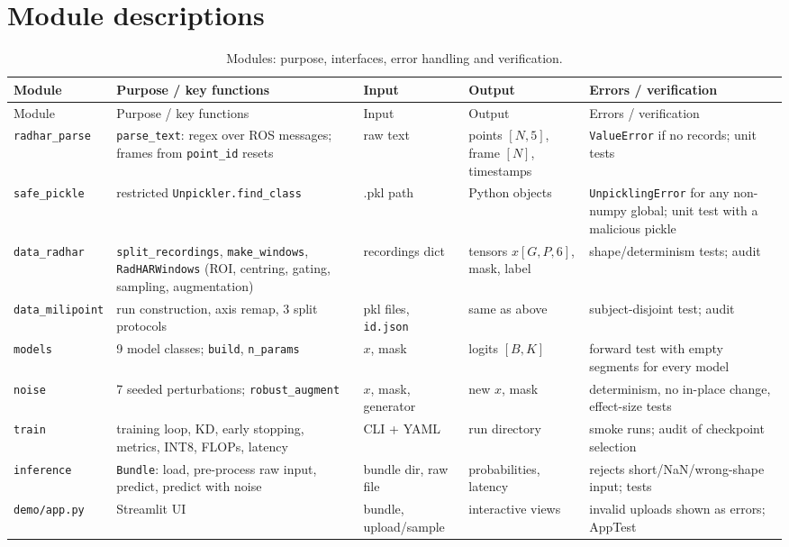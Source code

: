 \section{Module descriptions}
\begin{longtable}{L{2.6cm}L{3.4cm}L{2.6cm}L{2.6cm}L{3.2cm}}
\caption{Modules: purpose, interfaces, error handling and verification.}\label{tab:modules}\\
\toprule
Module & Purpose / key functions & Input & Output & Errors / verification \\
\midrule\endfirsthead
\toprule Module & Purpose / key functions & Input & Output & Errors / verification \\ \midrule\endhead
\texttt{radhar\_parse} & \texttt{parse\_text}: regex over ROS messages; frames from \texttt{point\_id} resets & raw text & points $[N,5]$, frame $[N]$, timestamps & \texttt{ValueError} if no records; unit tests \\
\texttt{safe\_pickle} & restricted \texttt{Unpickler.find\_class} & .pkl path & Python objects & \texttt{UnpicklingError} for any non-numpy global; unit test with a malicious pickle \\
\texttt{data\_radhar} & \texttt{split\_recordings}, \texttt{make\_windows}, \texttt{RadHARWindows} (ROI, centring, gating, sampling, augmentation) & recordings dict & tensors $x[G,P,6]$, mask, label & shape/determinism tests; audit \\
\texttt{data\_milipoint} & run construction, axis remap, 3 split protocols & pkl files, \texttt{id.json} & same as above & subject-disjoint test; audit \\
\texttt{models} & 9 model classes; \texttt{build}, \texttt{n\_params} & $x$, mask & logits $[B,K]$ & forward test with empty segments for every model \\
\texttt{noise} & 7 seeded perturbations; \texttt{robust\_augment} & $x$, mask, generator & new $x$, mask & determinism, no in-place change, effect-size tests \\
\texttt{train} & training loop, KD, early stopping, metrics, INT8, FLOPs, latency & CLI + YAML & run directory & smoke runs; audit of checkpoint selection \\
\texttt{inference} & \texttt{Bundle}: load, pre-process raw input, predict, predict with noise & bundle dir, raw file & probabilities, latency & rejects short/NaN/wrong-shape input; tests \\
\texttt{demo/app.py} & Streamlit UI & bundle, upload/sample & interactive views & invalid uploads shown as errors; AppTest \\
\bottomrule
\end{longtable}

